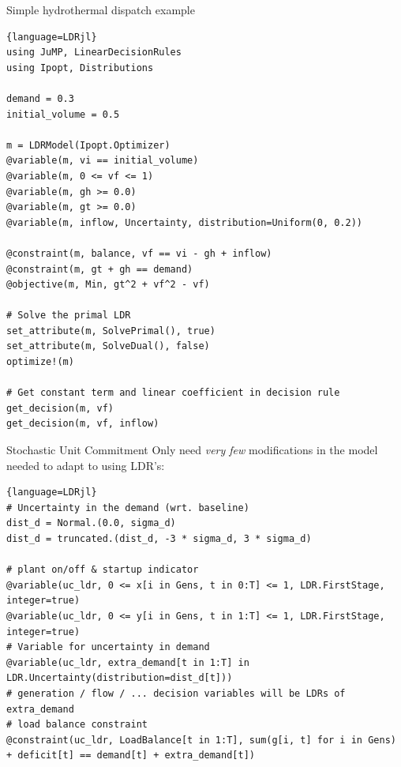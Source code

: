 \documentclass[a0paper,fontscale=0.285]{baposter} %
\begin{document}
\begin{poster}
{\begin{multicols}{2}
\end{multicols}
}


\begin{posterbox}[name=example1,column=1,span=2,below=features]
{Simple hydrothermal dispatch example}

  \begin{multicols}{2}
  \small
  \begin{lstlisting}{language=LDRjl}
using JuMP, LinearDecisionRules
using Ipopt, Distributions

demand = 0.3
initial_volume = 0.5

m = LDRModel(Ipopt.Optimizer)
@variable(m, vi == initial_volume)
@variable(m, 0 <= vf <= 1)
@variable(m, gh >= 0.0)
@variable(m, gt >= 0.0)
@variable(m, inflow, Uncertainty, distribution=Uniform(0, 0.2))

@constraint(m, balance, vf == vi - gh + inflow)
@constraint(m, gt + gh == demand)
@objective(m, Min, gt^2 + vf^2 - vf)

# Solve the primal LDR
set_attribute(m, SolvePrimal(), true)
set_attribute(m, SolveDual(), false)
optimize!(m)

# Get constant term and linear coefficient in decision rule
get_decision(m, vf)
get_decision(m, vf, inflow)
  \end{lstlisting}
  \end{multicols}
\end{posterbox}


\begin{posterbox}[name=example2,column=1,span=2,below=example1]
{Stochastic Unit Commitment}
Only need \emph{very few} modifications in the model needed to adapt to using LDR's:

  { \footnotesize
  \begin{lstlisting}{language=LDRjl}
# Uncertainty in the demand (wrt. baseline)
dist_d = Normal.(0.0, sigma_d)
dist_d = truncated.(dist_d, -3 * sigma_d, 3 * sigma_d)

# plant on/off & startup indicator
@variable(uc_ldr, 0 <= x[i in Gens, t in 0:T] <= 1, LDR.FirstStage, integer=true)
@variable(uc_ldr, 0 <= y[i in Gens, t in 1:T] <= 1, LDR.FirstStage, integer=true)
# Variable for uncertainty in demand
@variable(uc_ldr, extra_demand[t in 1:T] in LDR.Uncertainty(distribution=dist_d[t]))
# generation / flow / ... decision variables will be LDRs of extra_demand
# load balance constraint
@constraint(uc_ldr, LoadBalance[t in 1:T], sum(g[i, t] for i in Gens) + deficit[t] == demand[t] + extra_demand[t])
  \end{lstlisting} }


\end{posterbox}
\end{poster}
\end{document}

